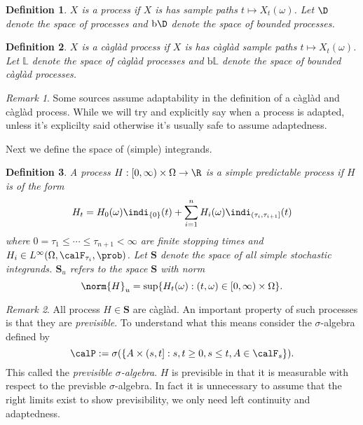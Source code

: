 \documentclass{scrreprt}
\theoremstyle{mydefn}
\newtheorem{defn}{Definition}
\theoremstyle{remark}
\newtheorem{remark}{Remark}
\newcommand{\caglad}{c\`agl\`ad}
\newcommand{\simpro}{\mathbf S}
\newcommand{\bdd}{\text{b}}
\newcommand\defeq{:=}
\begin{document}
\begin{defn}
	$X$ is a \emph{\cadlag{} process} if $X$ is has \cadlag{} sample paths $t \mapsto X_t(\omega)$. Let $\D$ denote the space of \cadlag{} processes and $\bdd \D$ denote the space of bounded \cadlag{} processes.
\end{defn}

\begin{defn}
	$X$ is a \emph{\caglad{} process} if $X$ is has \caglad{} sample paths $t \mapsto X_t(\omega)$. Let $\mathbb L$ denote the space of \caglad{} processes and $\bdd \mathbb L$ denote the space of bounded \caglad{} processes.
\end{defn}

\begin{remark}
	Some sources assume adaptability in the definition of a \caglad{} and \caglad{} process. While we will try and explicitly say when a process is adapted, unless it's explicilty said otherwise it's usually safe to assume adaptedness.
\end{remark}

Next we define the space of (simple) integrands.

\begin{defn}
	A process $H: [0, \infty) \times \Omega \to \R$ is a \emph{simple predictable process} if $H$ is of the form
	\begin{equation}
		\label{eq:simpro-form}
		H_t = H_0(\omega) \indi_{\{0\}}(t) + \sum_{i=1}^n H_i(\omega) \indi_{(\tau_i, \tau_{i+1}]}(t)
	\end{equation}
	where $0 = \tau_1 \leq \cdots \leq \tau_{n+1} < \infty$ are finite stopping times and $H_i \in L^{\infty}(\Omega, \calF_{\tau_i}, \prob)$. Let $\simpro$ denote the space of all simple stochastic integrands. $\simpro_u$ refers to the space $\simpro$ with norm
	\begin{equation}
		\norm{H}_u = \sup\{H_t(\omega) : (t, \omega) \in [0, \infty) \times \Omega\}.
	\end{equation}
\end{defn}

\begin{remark}
	All process $H \in \simpro$ are \caglad{}. An important property of such processes is that they are \emph{previsible}. To understand what this means consider the $\sigma$-algebra defined by
	\begin{equation}
		\calP \defeq \sigma(\{A \times (s, t] : s, t \geq 0, s \leq t, A \in \calF_s\}).
	\end{equation}
	This called the \emph{previsible $\sigma$-algebra}. $H$ is previsible in that it is measurable with respect to the previsble $\sigma$-algebra. In fact it is unnecessary to assume that the right limits exist to show previsibility, we only need left continuity and adaptedness.
\end{remark}
\end{document}
